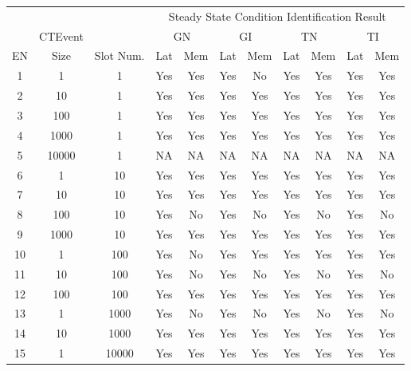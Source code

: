 \begin{table}[htb]
\centering
\scriptsize
 \begin{tabular}{c|c|c|cc|cc|cc|cc}
	  	\hline
	  	&&&\multicolumn{8}{c}{Steady State Condition Identification Result}  \\
	  	&CTEvent&&\multicolumn{2}{c}{GN}|&\multicolumn{2}{c}{GI}|&\multicolumn{2}{c}{TN}|&\multicolumn{2}{c}{TI}  \\
	  	EN&Size& Slot Num.&Lat&Mem&Lat&Mem&Lat&Mem&Lat&Mem  \\
		\hline
		\hline
		 1&1&1&Yes&Yes&Yes&\cellcolor[HTML]{C0C0C0}No&Yes&Yes&Yes&Yes\\
		 2&10&1&Yes&Yes&Yes&Yes&Yes&Yes&Yes&Yes\\
		 3&100&1&Yes&Yes&Yes&Yes&Yes&Yes&Yes&Yes\\
		 4&1000&1&Yes&Yes&Yes&Yes&Yes&Yes&Yes&Yes\\
		 5&10000&1&NA&NA&NA&NA&NA&NA&NA&NA\\
		 6&1&10&Yes&Yes&Yes&Yes&Yes&Yes&Yes&Yes\\
		 7&10&10&Yes&Yes&Yes&Yes&Yes&Yes&Yes&Yes\\
		 8&100&10&Yes&\cellcolor[HTML]{C0C0C0}No&Yes&\cellcolor[HTML]{C0C0C0}No&Yes&\cellcolor[HTML]{C0C0C0}No&Yes&\cellcolor[HTML]{C0C0C0}No\\
		 9&1000&10&Yes&Yes&Yes&Yes&Yes&Yes&Yes&Yes\\
		 10&1&100&Yes&\cellcolor[HTML]{C0C0C0}No&Yes&Yes&Yes&Yes&Yes&Yes\\
		 11&10&100&Yes&\cellcolor[HTML]{C0C0C0}No&Yes&\cellcolor[HTML]{C0C0C0}No&Yes&\cellcolor[HTML]{C0C0C0}No&Yes&\cellcolor[HTML]{C0C0C0}No\\
		 12&100&100&Yes&Yes&Yes&Yes&Yes&Yes&Yes&Yes\\
		 13&1&1000&Yes&\cellcolor[HTML]{C0C0C0}No&Yes&\cellcolor[HTML]{C0C0C0}No&Yes&\cellcolor[HTML]{C0C0C0}No&Yes&\cellcolor[HTML]{C0C0C0}No\\
		 14&10&1000&Yes&Yes&Yes&Yes&Yes&Yes&Yes&Yes\\
		 15&1&10000&Yes&Yes&Yes&Yes&Yes&Yes&Yes&Yes\\

		\hline 
 \end{tabular}


\end{table}
